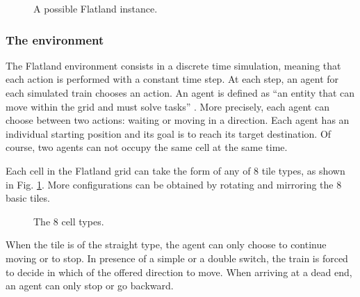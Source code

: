 \documentclass[a4paper, 12pt]{article}
\numberwithin{equation}{section}
\begin{document}
\begin{figure}[h]
	\centering
		\caption{A possible Flatland instance.}
\end{figure}

\subsubsection{The environment}

The Flatland environment \cite{flatland-challenge} consists in a discrete time simulation, meaning that each action is performed with a constant time step. At each step, an agent for each simulated train chooses an action. An agent is defined as ``an entity that can move within the grid and must solve tasks'' \cite{flatland-challenge}. More precisely, each agent can choose between two actions: waiting or moving in a direction. Each agent has an individual starting position and its goal is to reach its target destination. Of course, two agents can not occupy the same cell at the same time.

Each cell in the Flatland grid can take the form of any of 8 tile types, as shown in Fig. \ref{fig:cell-types}. More configurations can be obtained by rotating and mirroring the 8 basic tiles.

\begin{figure}[h]
	\centering
		\caption{The 8 cell types.}
	\label{fig:cell-types}
\end{figure}

When the tile is of the straight type, the agent can only choose to continue moving or to stop. In presence of a simple or a double switch, the train is forced to decide in which of the offered direction to move. When arriving at a dead end, an agent can only stop or go backward.
\end{document}
